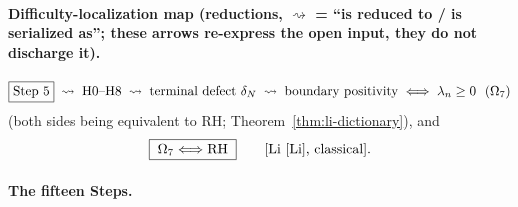 \documentclass[11pt]{amsart}
\theoremstyle{definition}
\theoremstyle{remark}
\theoremstyle{definition}
\begin{document}
\paragraph{Difficulty-localization map (reductions, $\rightsquigarrow$ = ``is reduced to / is serialized
as''; these arrows re-express the open input, they do not discharge it).}
\[
   \boxed{\textnormal{Step 5}}
   \;\rightsquigarrow\;
   \textnormal{H0--H8}
   \;\rightsquigarrow\;
   \textnormal{terminal defect }\delta_N
   \;\rightsquigarrow\;
   \textnormal{boundary positivity}
   \;\Longleftrightarrow\;
   \lambda_n\ge0\ \ (\Omega_7)
\]
(both sides being equivalent to RH; Theorem~\ref{thm:li-dictionary}), and
\[
   \boxed{\;\Omega_7\Longleftrightarrow\textnormal{RH}\;}
   \qquad\text{[Li \cite{Li}, classical].}
\]

\paragraph{The fifteen Steps.}
\end{document}
